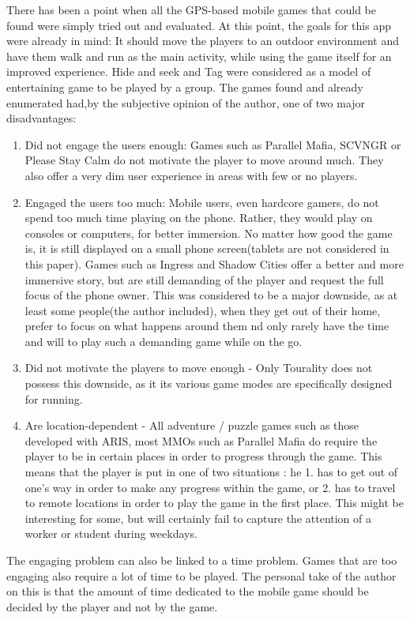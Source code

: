 There has been a point when all the GPS-based mobile games that could be
found were simply tried out and evaluated. At this point, the goals for this
app were already in mind: It should move the players to an outdoor environment
and have them walk and run as the main activity, while using the game itself for
an improved experience. Hide and seek and Tag were considered as a model of
entertaining game to be played by a group. The games found and already
enumerated had,by the subjective opinion of the author, one of two major
disadvantages:
\begin{enumerate}
  \item Did not engage the users enough: Games such as Parallel Mafia, SCVNGR or
  Please Stay Calm do not motivate the player to move around much. They also
  offer a very dim user experience in areas with few or no players.
  \item Engaged the users too much: Mobile users, even hardcore gamers, do not
  spend too much time playing on the phone. Rather, they would play on consoles
  or computers, for better immersion. No matter how good the game is, it is
  still displayed on a small phone screen(tablets are not considered in this
  paper). Games such as Ingress and Shadow Cities offer a better and more
  immersive story, but are still demanding of the player and request the full
  focus of the phone owner. This was considered to be a major downside, as
  at least some people(the author included), when they get out of their home,
  prefer to focus on what happens around them  nd only rarely have the time and
  will to play such a demanding game while on the go.
  \item Did not motivate the players to move enough - Only Tourality does not
  possess this downside, as it its various game modes are specifically designed
  for running.
  \item Are location-dependent - All adventure / puzzle games such as those
  developed with ARIS, most MMOs such as Parallel Mafia do require the player to
  be in certain places in order to progress through the game. This means that
  the player is put in one of two situations : he 1. has to get out of
  one's way in order to make any progress within the game, or 2. has to travel
  to remote locations in order to play the game in the first place. This might
  be interesting for some, but will certainly fail to capture the attention of a
  worker or student during weekdays.
\end{enumerate}

The engaging problem can also be linked to a time problem. Games that are too
engaging also require a lot of time to be played. The personal take of the
author on this is that the amount of time dedicated to the mobile game should be
decided by the player and not by the game. \newline

